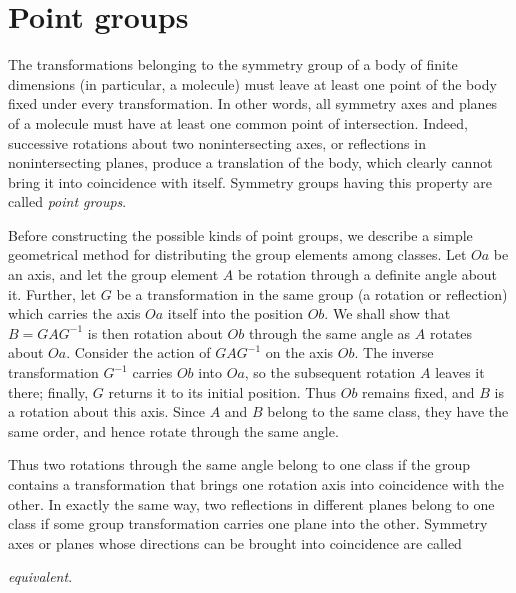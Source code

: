 \section{Point groups}

The transformations belonging to the symmetry group of a body of finite dimensions (in particular, a molecule) must leave at least one point of the body fixed under every transformation. In other words, all symmetry axes and planes of a molecule must have at least one common point of intersection. Indeed, successive rotations about two nonintersecting axes, or reflections in nonintersecting planes, produce a translation of the body, which clearly cannot bring it into coincidence with itself. Symmetry groups having this property are called \emph{point groups}.

Before constructing the possible kinds of point groups, we describe a simple geometrical method for distributing the group elements among classes. Let $Oa$ be an axis, and let the group element $A$ be rotation through a definite angle about it. Further, let $G$ be a transformation in the same group (a rotation or reflection) which carries the axis $Oa$ itself into the position $Ob$. We shall show that $B=GAG^{-1}$ is then rotation about $Ob$ through the same angle as $A$ rotates about $Oa$. Consider the action of $GAG^{-1}$ on the axis $Ob$. The inverse transformation $G^{-1}$ carries $Ob$ into $Oa$, so the subsequent rotation $A$ leaves it there; finally, $G$ returns it to its initial position. Thus $Ob$ remains fixed, and $B$ is a rotation about this axis. Since $A$ and $B$ belong to the same class, they have the same order, and hence rotate through the same angle.

Thus two rotations through the same angle belong to one class if the group contains a transformation that brings one rotation axis into coincidence with the other. In exactly the same way, two reflections in different planes belong to one class if some group transformation carries one plane into the other. Symmetry axes or planes whose directions can be brought into coincidence are called

\emph{equivalent}.


